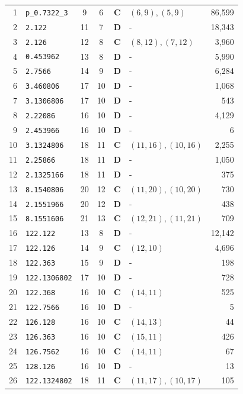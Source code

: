 \documentclass[11pt,a4paper]{article}
\begin{document}
\begin{small}
\begin{longtable}{r l c c c l r}
1 & \texttt{p\_0.7322\_3} & 9 & 6 & \textbf{C} & $(6,9), (5,9)$ & 86,599 \\
2 & \texttt{2.122} & 11 & 7 & \textbf{D} & - & 18,343 \\
3 & \texttt{2.126} & 12 & 8 & \textbf{C} & $(8,12), (7,12)$ & 3,960 \\
4 & \texttt{0.453962} & 13 & 8 & \textbf{D} & - & 5,990 \\
5 & \texttt{2.7566} & 14 & 9 & \textbf{D} & - & 6,284 \\
6 & \texttt{3.460806} & 17 & 10 & \textbf{D} & - & 1,068 \\
7 & \texttt{3.1306806} & 17 & 10 & \textbf{D} & - & 543 \\
8 & \texttt{2.22086} & 16 & 10 & \textbf{D} & - & 4,129 \\
9 & \texttt{2.453966} & 16 & 10 & \textbf{D} & - & 6 \\
10 & \texttt{3.1324806} & 18 & 11 & \textbf{C} & $(11,16), (10,16)$ & 2,255 \\
11 & \texttt{2.25866} & 18 & 11 & \textbf{D} & - & 1,050 \\
12 & \texttt{2.1325166} & 18 & 11 & \textbf{D} & - & 375 \\
13 & \texttt{8.1540806} & 20 & 12 & \textbf{C} & $(11,20), (10,20)$ & 730 \\
14 & \texttt{2.1551966} & 20 & 12 & \textbf{D} & - & 438 \\
15 & \texttt{8.1551606} & 21 & 13 & \textbf{C} & $(12,21), (11,21)$ & 709 \\
16 & \texttt{122.122} & 13 & 8 & \textbf{D} & - & 12,142 \\
17 & \texttt{122.126} & 14 & 9 & \textbf{C} & $(12,10)$ & 4,696 \\
18 & \texttt{122.363} & 15 & 9 & \textbf{D} & - & 198 \\
19 & \texttt{122.1306802} & 17 & 10 & \textbf{D} & - & 728 \\
20 & \texttt{122.368} & 16 & 10 & \textbf{C} & $(14,11)$ & 525 \\
21 & \texttt{122.7566} & 16 & 10 & \textbf{D} & - & 5 \\
22 & \texttt{126.128} & 16 & 10 & \textbf{C} & $(14,13)$ & 44 \\
23 & \texttt{126.363} & 16 & 10 & \textbf{C} & $(15,11)$ & 426 \\
24 & \texttt{126.7562} & 16 & 10 & \textbf{C} & $(14,11)$ & 67 \\
25 & \texttt{128.126} & 16 & 10 & \textbf{D} & - & 13 \\
26 & \texttt{122.1324802} & 18 & 11 & \textbf{C} & $(11,17), (10,17)$ & 105 \\

\end{longtable}
\end{small}
\end{document}
